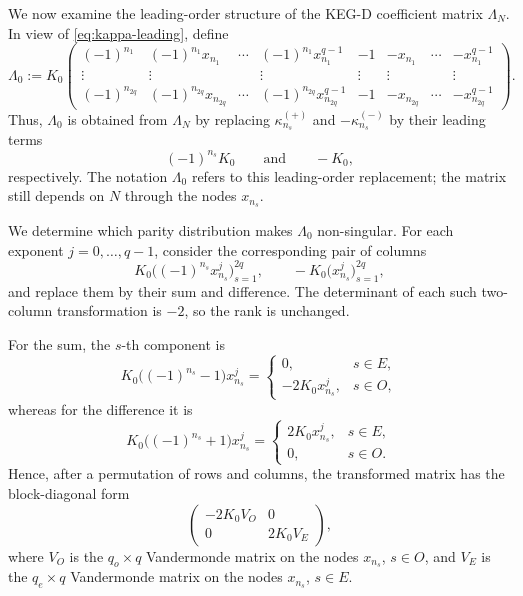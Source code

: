 \documentclass[11pt,a4paper]{article}
\theoremstyle{definition}
\begin{document}
We now examine the leading-order structure of the KEG-D coefficient
matrix \(\Lambda_N\). In view of \eqref{eq:kappa-leading}, define
\begin{equation}\label{eq:Lambda0}
\Lambda_0
:=
K_0
\begin{pmatrix}
(-1)^{n_1}
&
(-1)^{n_1}x_{n_1}
&
\cdots
&
(-1)^{n_1}x_{n_1}^{q-1}
&
-1
&
-x_{n_1}
&
\cdots
&
-x_{n_1}^{q-1}
\\
\vdots & \vdots & & \vdots
&
\vdots & \vdots & & \vdots
\\
(-1)^{n_{2q}}
&
(-1)^{n_{2q}}x_{n_{2q}}
&
\cdots
&
(-1)^{n_{2q}}x_{n_{2q}}^{q-1}
&
-1
&
-x_{n_{2q}}
&
\cdots
&
-x_{n_{2q}}^{q-1}
\end{pmatrix}.
\end{equation}
Thus, \(\Lambda_0\) is obtained from \(\Lambda_N\) by replacing
\(\kappa_{n_s}^{(+)}\) and \(-\kappa_{n_s}^{(-)}\) by their leading
terms
\[
(-1)^{n_s}K_0
\qquad\text{and}\qquad
-K_0,
\]
respectively. The notation \(\Lambda_0\) refers to this leading-order
replacement; the matrix still depends on \(N\) through the nodes
\(x_{n_s}\).

We determine which parity distribution makes \(\Lambda_0\)
non-singular. For each exponent \(j=0,\dots,q-1\), consider the
corresponding pair of columns
\[
K_0\bigl((-1)^{n_s}x_{n_s}^j\bigr)_{s=1}^{2q},
\qquad
-K_0\bigl(x_{n_s}^j\bigr)_{s=1}^{2q},
\]
and replace them by their sum and difference. The determinant of each
such two-column transformation is \(-2\), so the rank is unchanged.

For the sum, the \(s\)-th component is
\[
K_0\bigl((-1)^{n_s}-1\bigr)x_{n_s}^j
=
\begin{cases}
0, & s\in E,\\
-2K_0x_{n_s}^j, & s\in O,
\end{cases}
\]
whereas for the difference it is
\[
K_0\bigl((-1)^{n_s}+1\bigr)x_{n_s}^j
=
\begin{cases}
2K_0x_{n_s}^j, & s\in E,\\
0, & s\in O.
\end{cases}
\]
Hence, after a permutation of rows and columns, the transformed matrix
has the block-diagonal form
\[
\begin{pmatrix}
-2K_0V_O & 0\\
0 & 2K_0V_E
\end{pmatrix},
\]
where \(V_O\) is the \(q_o\times q\) Vandermonde matrix on the nodes
\(x_{n_s}\), \(s\in O\), and \(V_E\) is the \(q_e\times q\)
Vandermonde matrix on the nodes \(x_{n_s}\), \(s\in E\).
\end{document}
